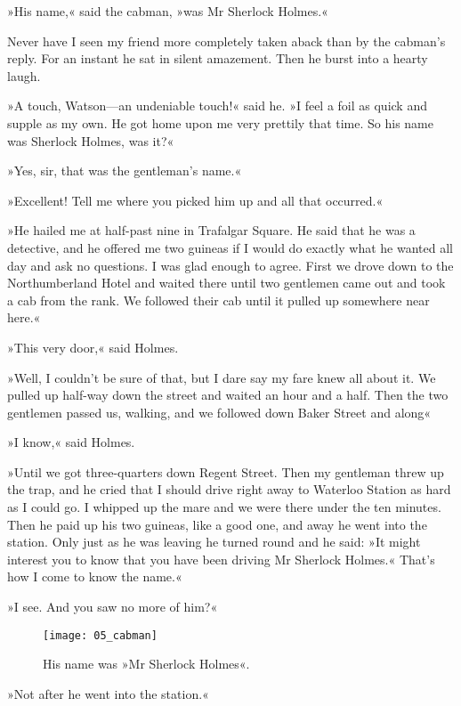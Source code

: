 »His name,« said the cabman, »was Mr Sherlock Holmes.«

Never have I seen my friend more completely taken aback than by the cabman's reply. For an instant he sat in silent amazement. Then he burst into a hearty laugh.

»A touch, Watson\allowbreak---\allowbreak an undeniable touch!« said he. »I feel a foil as quick and supple as my own. He got home upon me very prettily that time. So his name was Sherlock Holmes, was it?«

»Yes, sir, that was the gentleman's name.«

»Excellent! Tell me where you picked him up and all that occurred.«

»He hailed me at half-past nine in Trafalgar Square. He said that he was a detective, and he offered me two guineas if I would do exactly what he wanted all day and ask no questions. I was glad enough to agree. First we drove down to the Northumberland Hotel and waited there until two gentlemen came out and took a cab from the rank. We followed their cab until it pulled up somewhere near here.«

»This very door,« said Holmes.

»Well, I couldn't be sure of that, but I dare say my fare knew all about it. We pulled up half-way down the street and waited an hour and a half. Then the two gentlemen passed us, walking, and we followed down Baker Street and along\longdash«

»I know,« said Holmes.

»Until we got three-quarters down Regent Street. Then my gentleman threw up the trap, and he cried that I should drive right away to Waterloo Station as hard as I could go. I whipped up the mare and we were there under the ten minutes. Then he paid up his two guineas, like a good one, and away he went into the station. Only just as he was leaving he turned round and he said: »It might interest you to know that you have been driving Mr Sherlock Holmes.« That's how I come to know the name.«

»I see. And you saw no more of him?«

\begin{figure}[tbhp]
\centering
\texttt{[image: 05\_cabman]}
\caption{His name was »Mr Sherlock Holmes«.}
\end{figure}

\afterpage{\clearpage}


»Not after he went into the station.«

